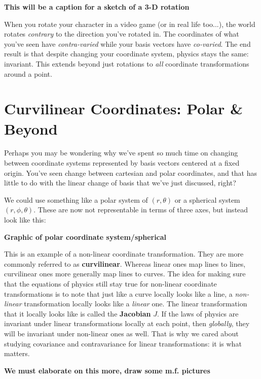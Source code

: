 \documentclass[../master.tex]{subfiles}
\begin{document}
	\textbf{This will be a caption for a sketch of a 3-D rotation}
	
	 When you rotate your character in a video game (or in real life too...), the world rotates \emph{contrary} to the direction you've rotated in. The coordinates of what you've seen have \emph{contra-varied} while your basis vectors have \emph{co-varied}. The end result is that despite changing your coordinate system, physics stays the same: invariant. This extends beyond just rotations to \emph{all} coordinate transformations around a point. 
	
	
	\section{Curvilinear Coordinates: Polar \& Beyond} %
	\label{sec:curvilinear_coordinates_polar_beyond}
	
	Perhaps you may be wondering why we've spent so much time on changing between coordinate systems represented by basis vectors centered at a fixed origin. You've seen change between cartesian and polar coordinates, and that has little to do with the linear change of basis that we've just discussed, right? 
	
	We could use something like a polar system of $(r,\theta)$ or a spherical system $(r, \phi, \theta)$. These are now not representable in terms of three axes, but instead look like this:
	
	\textbf{Graphic of polar coordinate system/spherical} 
	
	This is an example of a non-linear coordinate transformation. They are more commonly referred to as \textbf{curvilinear}. Whereas linear ones map lines to lines, curvilinear ones more generally map lines to curves. The idea for making sure that the equations of physics still stay true for non-linear coordinate transformations is to note that just like a curve locally looks like a line, a \emph{non-linear} transformation locally looks like a \emph{linear} one. The linear transformation that it locally looks like is called the \textbf{Jacobian}  $J$. If the laws of physics are invariant under linear transformations locally at each point, then \emph{globally}, they will be invariant under non-linear ones as well. That is why we cared about studying covariance and contravariance for linear transformations: it is what matters. 
	
	
	\textbf{We must elaborate on this more, draw some m.f. pictures}
	
\end{document}
